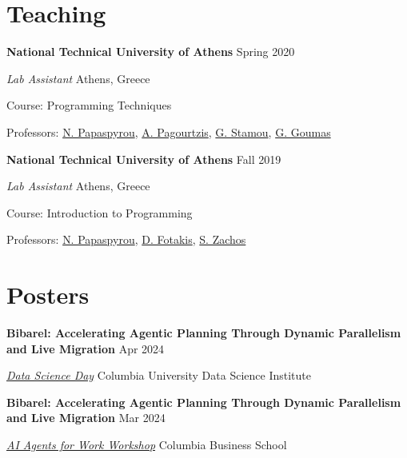 \documentclass[margin,12pt]{resume}
\newcommand{\subsectionVSpace}{\vspace{3.5ex}\xspace}
\newcommand{\sectionVSpace}{\vspace{1ex}\xspace} %
\newcommand{\sectionVSpaceCorrection}{\vspace{-3.5ex}} %
\newcommand{\header}[1]{\textbf{#1}\xspace}
\newcommand{\event}[1]{\textit{#1}\xspace}
\newcommand{\institution}[1]{\header{#1}\xspace}
\newcommand{\place}[1]{#1\xspace}
\newcommand{\poster}[1]{\header{#1}\xspace}
\newcommand{\role}[1]{\textit{#1}\xspace}
\newcommand{\singleDate}[1]{#1\xspace}
\newcommand{\stitle}[1]{#1:\xspace}
\newenvironment{rSubsection}{}{\par\subsectionVSpace}
\newenvironment{rSection}[1]{\sectionVSpaceCorrection\section{#1}\xspace}{\sectionVSpace\par}
\begin{document}
\begin{resume}
\begin{rSection}{Teaching}
        \begin{rSubsection}
            \institution{National Technical University of Athens} \hfill \singleDate{Spring 2020}

            \role{Lab Assistant} \hfill \place{Athens, Greece}

            \stitle{Course} Programming Techniques

            \stitle{Professors} \href{http://www.softlab.ntua.gr/~nickie/}{N. Papaspyrou}, \href{http://users.softlab.ntua.gr/~pagour/}{A. Pagourtzis}, \href{http://www.image.ntua.gr/~gstam/}{G. Stamou}, \href{http://www.cslab.ntua.gr/~goumas/}{G. Goumas}
        \end{rSubsection}

        \begin{rSubsection}
            \institution{National Technical University of Athens} \hfill \singleDate{Fall 2019}

            \role{Lab Assistant} \hfill \place{Athens, Greece}

            \stitle{Course} Introduction to Programming

            \stitle{Professors} \href{http://www.softlab.ntua.gr/~nickie/}{N. Papaspyrou}, \href{http://www.softlab.ntua.gr/~fotakis/}{D. Fotakis}, \href{https://en.wikipedia.org/wiki/Stathis_Zachos}{S. Zachos}
        \end{rSubsection}
    \end{rSection}

    \begin{rSection}{Posters}
        \begin{rSubsection}
            \poster{Bibarel: Accelerating Agentic Planning Through Dynamic Parallelism and Live Migration} \hfill Apr 2024

            \event{\href{https://datascience.columbia.edu/event/data-science-day-2025/}{Data Science Day}} \hfill \place{Columbia University Data Science Institute}
        \end{rSubsection}

        \begin{rSubsection}
            \poster{Bibarel: Accelerating Agentic Planning Through Dynamic Parallelism and Live Migration} \hfill Mar 2024

            \event{\href{https://daplab.cs.columbia.edu/workshop/}{AI Agents for Work Workshop}} \hfill \place{Columbia Business School}
        \end{rSubsection}
    \end{rSection}


\end{resume}
\end{document}
